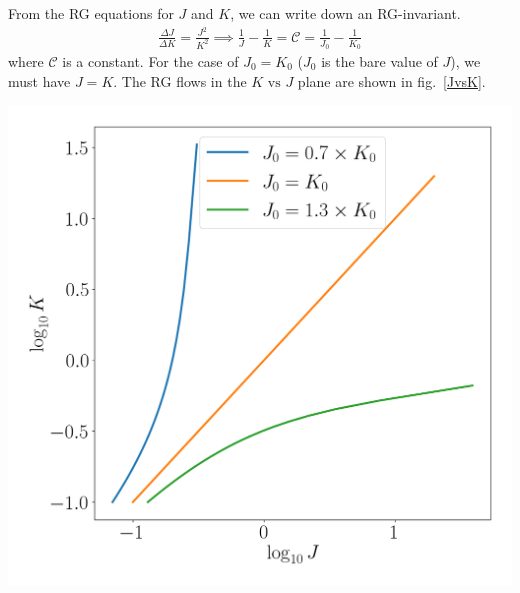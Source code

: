 \documentclass[12pt,twoside]{article}
\numberwithin{equation}{section}
\begin{document}
From the RG equations for \(J\) and \(K\), we can write down an RG-invariant.
\begin{equation}\begin{aligned}
	\label{rginv}
	\frac{\Delta J}{\Delta K} = \frac{J^2}{K^2} \implies \frac{1}{J} - \frac{1}{K} = \mathcal{C} = \frac{1}{J_0} - \frac{1}{K_0}
\end{aligned}\end{equation}
where \(\mathcal{C}\) is a constant. For the case of \(J_0 = K_0\) (\(J_0\) is the bare value of \(J\)), we must have \(J=K\). The RG flows in the \(K \text{ vs } J\) plane are shown in fig.~\ref{JvsK}.
\begin{center}
	\includegraphics[scale=0.35]{../figures/JvsK.png}
	\label{JvsK}
\end{center}
\end{document}
